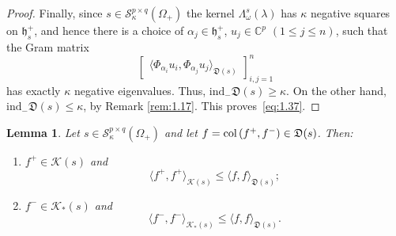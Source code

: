 \documentclass[12pt,twoside,a4paper]{amsart}
\newtheorem{lem}[thm]{Lemma}
\theoremstyle{definition}
\numberwithin{equation}{section}
\begin{document}
\begin{proof}
Finally,  since $s \in {\mathcal S}_{\kappa}^{p\times q}(\Omega_+)$ the
kernel ${\mathsf \Lambda}_{\omega}^s(\lambda)$ has $\kappa$ negative
squares on ${{\mathfrak h}}_s^+$, and hence there is a choice of
$\alpha_j\in{{\mathfrak h}}_s^+$, $ u_j\in{{\mathbb C}}^p$ $(1\le j\le n)$, such that the
Gram matrix
 \[
    \begin{bmatrix}
    \langle\Phi_{\alpha_i}u_i,\Phi_{\alpha_j}u_j\rangle_{{{\mathfrak D}}(s)}
    \end{bmatrix}_{i,j=1}^{n}
 \]
has exactly $\kappa$ negative eigenvalues.
Thus, $\mbox{ind}_-{{\mathfrak D}}(s)\ge \kappa$. On the other hand,
$\mbox{ind}_-{{\mathfrak D}}(s)\le \kappa$, by Remark \ref{rem:1.17}.
This proves~\eqref{eq:1.37}.
\end{proof}

\begin{lem}\label{HandD}
  Let $s\in {\mathcal S}_{\kappa}^{p\times q}(\Omega_+)$ and let
$f=\textup{col}\,(f^+, f^-)\in{{\mathfrak D}}(s)$. Then:
\begin{enumerate}
  \item[\rm(1)] $f^+\in{{\mathcal K}}(s)$ and
\begin{equation}\label{eq:1.33A}
  \langle f^+,f^+\rangle_{{{\mathcal K}}(s)}\le\langle f,f\rangle_{{{\mathfrak D}}(s)};
\end{equation}
    \item[\rm(2)]
    $f^-\in{{\mathcal K}}_*(s)$ and
\begin{equation}\label{eq:1.33B}
  \langle f^-,f^-\rangle_{{{\mathcal K}}_*(s)}\le\langle f,f\rangle_{{{\mathfrak D}}(s)}.
\end{equation}
\end{enumerate}
 \end{lem}
\end{document}
